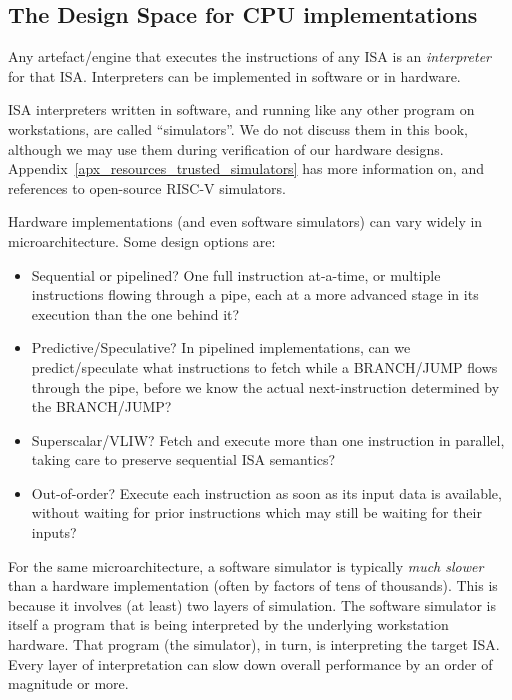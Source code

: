 \label{Sec_Drum_and_Fife}


\subsection{The Design Space for CPU implementations}

\label{Sec_Interpreters}

Any artefact/engine that executes the instructions of any ISA is an
\emph{interpreter} for that ISA.  Interpreters can be implemented in
software or in hardware.

ISA interpreters written in software, and running like any other
program on workstations, are called ``simulators''.  We do not discuss
them in this book, although we may use them during verification of our
hardware designs.  Appendix~\ref{apx_resources_trusted_simulators} has
more information on, and references to open-source RISC-V simulators.

Hardware implementations (and even software simulators) can vary
widely in microarchitecture.  Some design options are:

\begin{itemize}

  \item Sequential or pipelined?  One full instruction at-a-time, or
    multiple instructions flowing through a pipe, each at a more
    advanced stage in its execution than the one behind it?

  \item Predictive/Speculative? In pipelined implementations, can we
    predict/speculate what instructions to fetch while a BRANCH/JUMP
    flows through the pipe, before we know the actual next-instruction
    determined by the BRANCH/JUMP?

  \item Superscalar/VLIW? Fetch and execute more than one instruction
    in parallel, taking care to preserve sequential ISA semantics?

  \item Out-of-order? Execute each instruction as soon as its input
    data is available, without waiting for prior instructions which
    may still be waiting for their inputs?

\end{itemize}

For the same microarchitecture, a software simulator is typically
\emph{much slower} than a hardware implementation (often by factors of
tens of thousands).  This is because it involves (at least) two layers
of simulation. The software simulator is itself a program that is
being interpreted by the underlying workstation hardware.  That
program (the simulator), in turn, is interpreting the target ISA.
Every layer of interpretation can slow down overall performance by
an order of magnitude or more.

